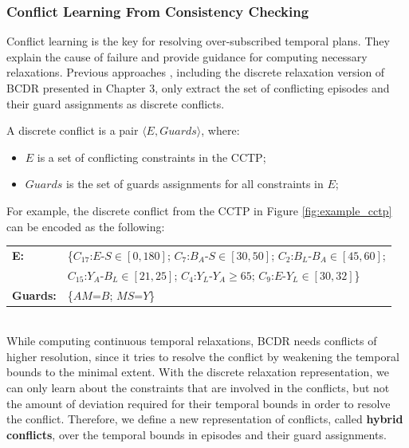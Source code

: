 \documentclass[jair,twoside,11pt,theapa]{article}
\begin{document}
\subsubsection{Conflict Learning From Consistency Checking}


Conflict learning is the key for resolving over-subscribed temporal plans. They
explain the cause of failure and provide guidance for computing necessary
relaxations. Previous approaches
\cite{bobby_csail_report_2005,Li05generalizedconflict}, including the discrete
relaxation version of BCDR
presented in Chapter 3, only extract the set of conflicting episodes and their
guard assignments as discrete conflicts.


\begin{mydef}
	A discrete conflict is a pair $\langle E,Guards\rangle$, where:
	\begin{itemize}
		\item $E$ is a set of conflicting constraints in the CCTP;
		\item $Guards$ is the set of guards assignments for all constraints in $E$;
	\end{itemize}
\end{mydef}


For example, the discrete conflict from the CCTP in Figure \ref{fig:example_cctp}
can be encoded as the following:\\

\begin{tabular}{m{2.5cm} m{11cm}}
	\textbf{E:} 	& \{$C_{17}$:$E$-$S\in[0,180]$; $C_7$:$B_A$-$S\in[30,50]$;
	$C_2$:$B_L$-$B_A\in[45,60]$;\\
	& $C_{15}$:$Y_A$-$B_L\in[21,25]$; $C_4$:$Y_L$-$Y_A\geq65$;
	$C_9$:$E$-$Y_L\in[30,32]$\}\\
	\textbf{Guards:} 	& \{$AM$=$B$; $MS$=$Y$\}\\
\end{tabular}\\

While computing continuous temporal relaxations, BCDR needs
conflicts of higher resolution, since it tries to resolve the conflict by
weakening the temporal bounds to the minimal extent. With the discrete
relaxation representation, we
can only learn about the constraints that are involved in the conflicts, but not
the amount of deviation required for their temporal bounds in order to resolve
the conflict. Therefore, we define a new representation of conflicts, called
\textbf{hybrid conflicts}, over the temporal bounds in episodes and their guard
assignments.
\end{document}
